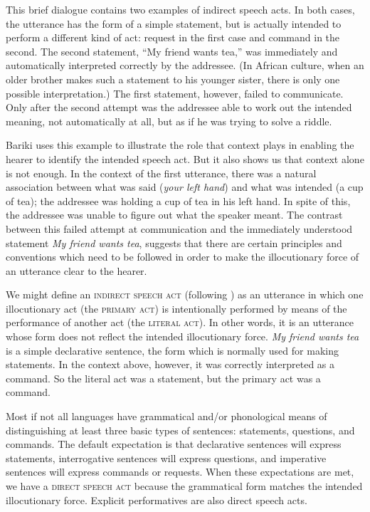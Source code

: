 This brief dialogue contains two examples of indirect speech acts. In both cases, the utterance has the form of a simple statement, but is actually intended to perform a different kind of act: request in the first case and command in the second. The second statement, “My friend wants tea,” was immediately and automatically interpreted correctly by the addressee. (In African culture, when an older brother makes such a statement to his younger sister, there is only one possible interpretation.) The first statement, however, failed to communicate. Only after the second attempt was the addressee able to work out the intended meaning, not automatically at all, but as if he was trying to solve a riddle.



Bariki uses this example to illustrate the role that context plays in enabling the hearer to identify the intended speech act. But it also shows us that context alone is not enough. In the context of the first utterance, there was a natural association between what was said (\textit{your left hand}) and what was intended (a cup of tea); the addressee was holding a cup of tea in his left hand. In spite of this, the addressee was unable to figure out what the speaker meant. The contrast between this failed attempt at communication and the immediately understood statement \textit{My friend wants tea}, suggests that there are certain principles and conventions which need to be followed in order to make the illocutionary force of an utterance clear to the hearer.



We might define an \textsc{indirect speech act} (following \citealt{Searle1975}) as an utterance in which one illocutionary act (the \textsc{primary act}) is intentionally performed by means of the performance of another act (the \textsc{literal act}). In other words, it is an utterance whose form does not reflect the intended illocutionary force. \textit{My friend wants tea} is a simple declarative sentence, the form which is normally used for making statements. In the context above, however, it was correctly interpreted as a command. So the literal act was a statement, but the primary act was a command.



Most if not all languages have grammatical and/or phonological means of distinguishing at least three basic types of sentences: statements, questions, and commands. The default expectation is that declarative sentences will express statements, interrogative sentences will express questions, and imperative sentences will express commands or requests. When these expectations are met, we have a \textsc{direct speech act} because the grammatical form matches the intended illocutionary force. Explicit performatives are also direct speech acts.




